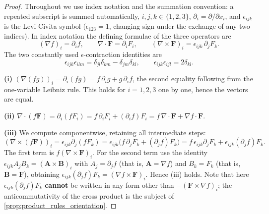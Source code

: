 \begin{proof}
Throughout we use index notation and the summation convention: a repeated subscript is summed automatically, $i,j,k\in\{1,2,3\}$, $\partial_i = \partial/\partial x_i$, and $\epsilon_{ijk}$ is the Levi-Civita symbol ($\epsilon_{123}=1$, changing sign under the exchange of any two indices). In index notation the defining formulae of the three operators are
\[
(\nabla f)_i = \partial_i f,\qquad
\nabla\cdot\mathbf F = \partial_iF_i,\qquad
(\nabla\times\mathbf F)_i = \epsilon_{ijk}\,\partial_jF_k .
\]
The two constantly used $\epsilon$-contraction identities are
\[
\epsilon_{ijk}\epsilon_{ilm} = \delta_{jl}\delta_{km}-\delta_{jm}\delta_{kl},
\qquad
\epsilon_{ijk}\epsilon_{ijl} = 2\delta_{kl}.
\]

\textbf{(i)} $(\nabla(fg))_i = \partial_i(fg) = f\,\partial_ig + g\,\partial_if$, the second equality following from the one-variable Leibniz rule. This holds for $i=1,2,3$ one by one, hence the vectors are equal.

\textbf{(ii)} $\nabla\cdot(f\mathbf F) = \partial_i(fF_i) = f\,\partial_iF_i + (\partial_if)F_i = f\,\nabla\cdot\mathbf F + \nabla f\cdot\mathbf F$.

\textbf{(iii)} We compute componentwise, retaining all intermediate steps:
\[
(\nabla\times(f\mathbf F))_i = \epsilon_{ijk}\partial_j(fF_k)
= \epsilon_{ijk}\bigl(f\,\partial_jF_k + (\partial_jf)F_k\bigr)
= f\,\epsilon_{ijk}\partial_jF_k + \epsilon_{ijk}(\partial_jf)F_k .
\]
The first term is $f(\nabla\times\mathbf F)_i$. For the second term use the identity $\epsilon_{ijk}A_jB_k = (\mathbf A\times\mathbf B)_i$ with $A_j=\partial_jf$ (that is, $\mathbf A=\nabla f$) and $B_k=F_k$ (that is, $\mathbf B=\mathbf F$), obtaining $\epsilon_{ijk}(\partial_jf)F_k = (\nabla f\times\mathbf F)_i$. Hence (iii) holds. Note that here $\epsilon_{ijk}(\partial_jf)F_k$ \textbf{cannot} be written in any form other than $-(\mathbf F\times\nabla f)_i$; the anticommutativity of the cross product is the subject of \cref{prop:product_rules_orientation}.


\end{proof}
